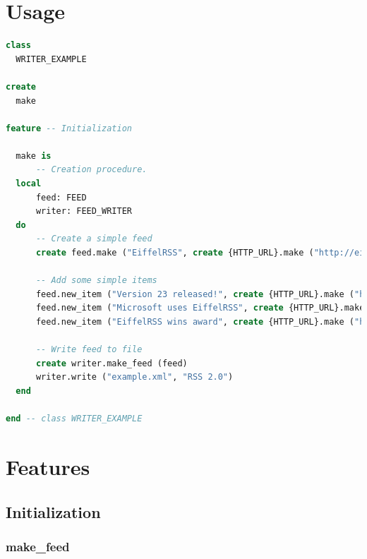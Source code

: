 \section{Usage}
\label{sec:feed-writer-usage}

\begin{lstlisting}[language=Eiffel]
class
  WRITER_EXAMPLE

create
  make

feature -- Initialization

  make is
      -- Creation procedure.
  local
      feed: FEED
      writer: FEED_WRITER
  do
      -- Create a simple feed
      create feed.make ("EiffelRSS", create {HTTP_URL}.make ("http://eiffelrss.berlios.de/Main/AllRecentChanges?action=rss"), "EiffelRSS news")
      
      -- Add some simple items
      feed.new_item ("Version 23 released!", create {HTTP_URL}.make ("http://eiffelrss.berlios.de/Main/News"), "Version 23 of EiffelRSS got release today. Happy syndicating!")      
      feed.new_item ("Microsoft uses EiffelRSS", create {HTTP_URL}.make ("http://eiffelrss.berlios.de/Main/WhoUsesEiffelRSS"), "Microsoft announced in a press release today that they will use EiffelRSS to syndicate news on their website.")
      feed.new_item ("EiffelRSS wins award", create {HTTP_URL}.make ("http://eiffelrss.berlios.de/Main/Awards"), "EiffelRSS has been awarded by ISE as best syndication software written in Eiffel. For more info see award-winning pages: http://eiffelrss.berlios.de")
        
      -- Write feed to file
      create writer.make_feed (feed)
      writer.write ("example.xml", "RSS 2.0")
  end

end -- class WRITER_EXAMPLE
\end{lstlisting}


\section{Features}
\label{sec:feed-writer-features}

\subsection{Initialization}
\label{sec:feed-writer-initialization}

\subsubsection{make\_feed}

